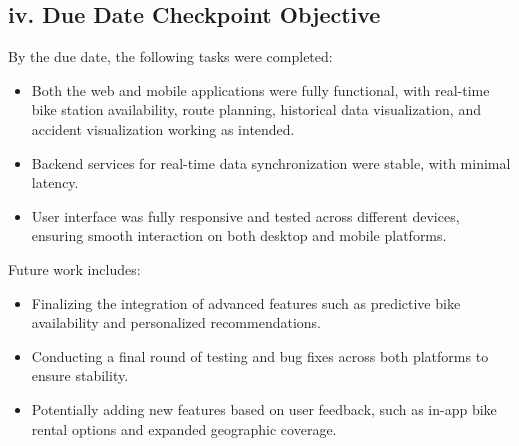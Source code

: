 \documentclass[12pt]{article}
\begin{document}
\subsection*{iv. Due Date Checkpoint Objective}
By the due date, the following tasks were completed:
\begin{itemize}
    \item Both the web and mobile applications were fully functional, with real-time bike station availability, route planning, historical data visualization, and accident visualization working as intended.
    \item Backend services for real-time data synchronization were stable, with minimal latency.
    \item User interface was fully responsive and tested across different devices, ensuring smooth interaction on both desktop and mobile platforms.
\end{itemize}
Future work includes:
\begin{itemize}
    \item Finalizing the integration of advanced features such as predictive bike availability and personalized recommendations.
    \item Conducting a final round of testing and bug fixes across both platforms to ensure stability.
    \item Potentially adding new features based on user feedback, such as in-app bike rental options and expanded geographic coverage.
\end{itemize}
\end{document}
